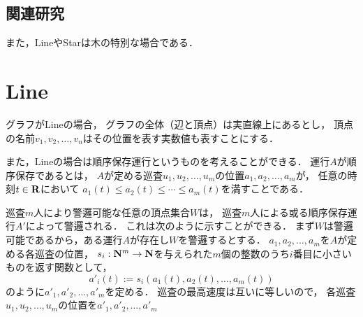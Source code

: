 \subsection*{関連研究}



また，LineやStarは木の特別な場合である．


\section{Line}
\label{section: line}

グラフがLineの場合，
グラフの全体（辺と頂点）は実直線上にあるとし，
頂点の名前$v_1, v_2, \ldots, v_n$はその位置を表す実数値も表すことにする．

また，Lineの場合は順序保存運行というものを考えることができる．
運行$A$が順序保存であるとは，
$A$が定める巡査$u_1, u_2, \ldots, u_m$の位置$a_1, a_2, \ldots, a_m$が，
任意の時刻$t \in \mathbf R$において
$a_1(t) \leq a_2(t) \leq \cdots \leq a_m(t)$を満すことである．

巡査$m$人により警邏可能な任意の頂点集合$W$は，
巡査$m$人による或る順序保存運行$A'$によって警邏される．
%
これは次のように示すことができる．
%
まず$W$は警邏可能であるから，ある運行$A$が存在し$W$を警邏するとする．
$a_1, a_2, \ldots, a_m$を$A$が定める各巡査の位置，
$s_i : \mathbf N^m \to \mathbf N$を与えられた$m$個の整数のうち$i$番目に小さいものを返す関数として，
\[ a'_i(t) := s_i( a_1(t), a_2(t), \ldots, a_m(t) ) \]
のように$a'_1, a'_2, \ldots, a'_m$を定める．
巡査の最高速度は互いに等しいので，
各巡査$u_1, u_2, \ldots, u_m$の位置を$a'_1, a'_2, \ldots, a'_m$%

%

